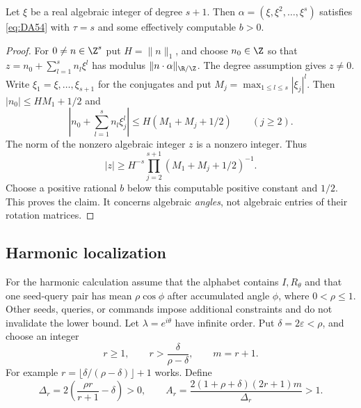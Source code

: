 \begin{proposition}\label{prop:algebraicangles54}
Let $\xi$ be a real algebraic integer of degree $s+1$. Then
$\alpha=(\xi,\xi^2,\ldots,\xi^s)$ satisfies \eqref{eq:DA54} with $\tau=s$ and some effectively computable $b>0$.
\end{proposition}
\begin{proof}
For $0\ne n\in\Z^s$ put $H=\|n\|_1$, and choose $n_0\in\Z$ so that
$z=n_0+\sum_{l=1}^s n_l\xi^l$ has modulus $\|n\cdot\alpha\|_{\R/\Z}$.
The degree assumption gives $z\ne0$. Write $\xi_1=\xi,\ldots,\xi_{s+1}$ for the conjugates and put $M_j=\max_{1\le l\le s}|\xi_j|^l$. Then
$|n_0|\le H M_1+1/2$ and
\[
 \left|n_0+\sum_{l=1}^s n_l\xi_j^l\right|
 \le H(M_1+M_j+1/2)\qquad(j\ge2).
\]
The norm of the nonzero algebraic integer $z$ is a nonzero integer. Thus
\[
 |z|\ge H^{-s}\prod_{j=2}^{s+1}(M_1+M_j+1/2)^{-1}.
\]
Choose a positive rational $b$ below this computable positive constant and $1/2$. This proves the claim. It concerns algebraic \emph{angles}, not algebraic entries of their rotation matrices.
\end{proof}

\subsection{Harmonic localization}
For the harmonic calculation assume that the alphabet contains $I,R_\theta$ and that one seed-query pair has mean $\rho\cos\phi$ after accumulated angle $\phi$, where $0<\rho\le1$. Other seeds, queries, or commands impose additional constraints and do not invalidate the lower bound. Let $\lambda=e^{i\theta}$ have infinite order. Put $\delta=2\varepsilon<\rho$, and choose an integer
\begin{equation}\label{eq:r53}
 r\ge1,\qquad r>\frac{\delta}{\rho-\delta},\qquad m=r+1.
\end{equation}
For example $r=\lfloor\delta/(\rho-\delta)\rfloor+1$ works. Define
\begin{equation}\label{eq:circleconstants53}
 \Delta_r=2\left(\frac{\rho r}{r+1}-\delta\right)>0,\qquad
 A_r=\frac{2(1+\rho+\delta)(2r+1)m}{\Delta_r}>1.
\end{equation}

